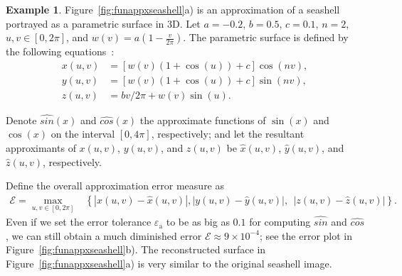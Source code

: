 \documentclass[review]{elsarticle}
\newcommand{\abstol}{\varepsilon_{\textrm{a}}}
\theoremstyle{definition}
\newtheorem{exmp}{Example}
\newcommand{\cosappx}{\widehat{cos}}
\newcommand{\sinappx}{\widehat{sin}}
\begin{document}
\begin{exmp}
 
Figure~\ref{fig:funappxseashell}a) is an approximation of a 
seashell portrayed as a parametric surface in 3D. Let $a=-0.2$, $b=0.5$,
$c=0.1$, $n = 2$, $u,v \in [0, 2 \pi]$, and $w(v) =
a\left(1-\frac{v}{2\pi}\right)$. The parametric surface is defined by the
following equations~\cite{DavEtal05}:
\begin{align*}
x(u,v) & =   \left[ w(v) \left(1+\cos(u)\right) + c\right]\cos(nv),\\
y(u,v) & = \left[w(v) (1+\cos(u)) + c\right] \sin(nv),\\
z(u,v) & = {bv}/{2\pi} + w(v)\sin(u).
\end{align*}
%

Denote $\sinappx(x)$ and $\cosappx (x)$ the approximate functions of $\sin(x)$ and
$\cos(x)$ on the interval $[0,4\pi]$, respectively; and let the resultant
approximants of $x(u,v)$, $y(u,v)$, and $z(u,v)$ be $\hat{x}(u,v)$,
$\hat{y}(u,v)$, and $\hat{z}(u,v)$, respectively.

Define the overall approximation error measure as
\begin{align*}
\mathscr{E} =  \max\limits_{u,v \in [0, 2 \pi] } & \left\{   |x(u,v)-\hat{x}(u,v)|,\right.
   \left.  |y(u,v)-\hat{y}(u,v)|, 
                                  \ \    |z(u,v)-\hat{z}(u,v)|\right\}.
\end{align*}
Even if we set the error tolerance $\abstol$ to be as big as $0.1$ for computing
$\sinappx$ and $\cosappx$, we can still obtain a much diminished error
$\mathscr{E}\approx 9 \times 10^{-4}$; see the error plot in
Figure~\ref{fig:funappxseashell}b). The reconstructed surface in
Figure~\ref{fig:funappxseashell}a) is very similar to the original seashell
image.
\end{exmp}
\end{document}

